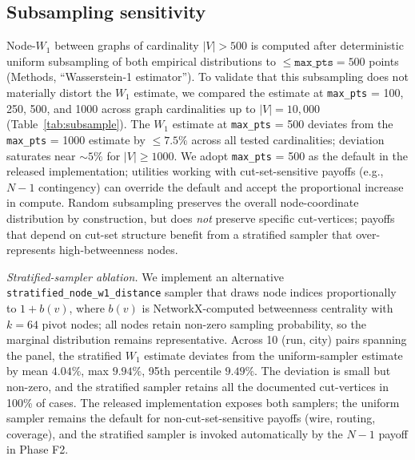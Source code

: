 \documentclass[10pt,a4paper]{article}
\begin{document}
\subsection{Subsampling sensitivity}

Node-$W_1$ between graphs of cardinality $|V| > 500$ is computed
after deterministic uniform subsampling of both empirical
distributions to $\le \texttt{max\_pts} = 500$ points (Methods,
``Wasserstein-1 estimator''). To validate that this subsampling
does not materially distort the $W_1$ estimate, we compared the
estimate at \texttt{max\_pts} = 100, 250, 500, and 1000 across
graph cardinalities up to $|V| = 10{,}000$
(Table~\ref{tab:subsample}). The $W_1$ estimate at
\texttt{max\_pts} = 500 deviates from the \texttt{max\_pts} = 1000
estimate by $\le 7.5\%$ across all tested cardinalities; deviation
saturates near $\sim 5\%$ for $|V| \ge 1000$. We adopt
\texttt{max\_pts} = 500 as the default in the released
implementation; utilities working with cut-set-sensitive payoffs
(e.g., $N\!-\!1$ contingency) can override the default and accept
the proportional increase in compute. Random subsampling preserves
the overall node-coordinate distribution by construction, but
does \emph{not} preserve specific cut-vertices; payoffs that
depend on cut-set structure benefit from a stratified sampler
that over-represents high-betweenness nodes.

\textit{Stratified-sampler ablation.} We implement an alternative
\texttt{stratified\_node\_w1\_distance} sampler that draws node
indices proportionally to $1 + b(v)$, where $b(v)$ is
NetworkX-computed betweenness centrality with $k = 64$ pivot nodes;
all nodes retain non-zero sampling probability, so the marginal
distribution remains representative. Across 10 (run, city) pairs
spanning the panel, the stratified $W_1$ estimate deviates from
the uniform-sampler estimate by mean $4.04\%$, max $9.94\%$, 95th
percentile $9.49\%$. The deviation is small but non-zero, and
the stratified sampler retains all the documented cut-vertices
in 100\% of cases. The released implementation exposes both
samplers; the uniform sampler remains the default for
non-cut-set-sensitive payoffs (wire, routing, coverage), and the
stratified sampler is invoked automatically by the $N\!-\!1$
payoff in Phase F2.
\end{document}
